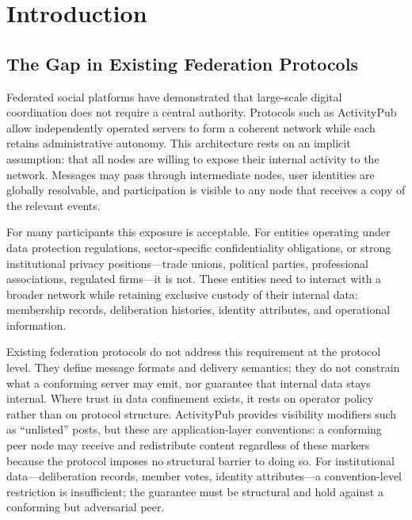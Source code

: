 \documentclass[12pt]{article}
\begin{document}
	
	\section{Introduction}
	\label{sec:intro}
	
	\subsection{The Gap in Existing Federation Protocols}
	
	Federated social platforms have demonstrated that large-scale digital
	coordination does not require a central authority. Protocols such as
	ActivityPub~\cite{w3c2018activitypub} allow independently operated
	servers to form a coherent network while each retains administrative
	autonomy. This architecture rests on an implicit assumption: that all
	nodes are willing to expose their internal activity to the network.
	Messages may pass through intermediate nodes, user identities are
	globally resolvable, and participation is visible to any node that
	receives a copy of the relevant events.
	
	For many participants this exposure is acceptable. For entities
	operating under data protection regulations, sector-specific
	confidentiality obligations, or strong institutional privacy
	positions---trade unions, political parties, professional associations,
	regulated firms---it is not. These entities need to interact with a
	broader network while retaining exclusive custody of their internal
	data: membership records, deliberation histories, identity attributes,
	and operational information.
	
	Existing federation protocols do not address this requirement at the
	protocol level. They define message formats and delivery semantics;
	they do not constrain what a conforming server may emit, nor guarantee
	that internal data stays internal. Where trust in data confinement
	exists, it rests on operator policy rather than on protocol structure.
	ActivityPub provides visibility modifiers such as ``unlisted'' posts,
	but these are application-layer conventions: a conforming peer node
	may receive and redistribute content regardless of these markers
	because the protocol imposes no structural barrier to doing so. For
	institutional data---deliberation records, member votes, identity
	attributes---a convention-level restriction is insufficient; the
	guarantee must be structural and hold against a conforming but
	adversarial peer.
	
\end{document}
